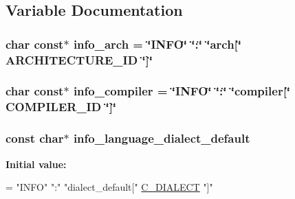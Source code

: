 \subsection{Variable Documentation}
\subsubsection[{\texorpdfstring{info\+\_\+arch}{info_arch}}]{\setlength{\rightskip}{0pt plus 5cm}char const$\ast$ info\+\_\+arch = \char`\"{}I\+N\+FO\char`\"{} \char`\"{}\+:\char`\"{} \char`\"{}arch\mbox{[}\char`\"{} A\+R\+C\+H\+I\+T\+E\+C\+T\+U\+R\+E\+\_\+\+ID \char`\"{}\mbox{]}\char`\"{}}\hypertarget{a00014_a59647e99d304ed33b15cb284c27ed391_a59647e99d304ed33b15cb284c27ed391}{}\label{a00014_a59647e99d304ed33b15cb284c27ed391_a59647e99d304ed33b15cb284c27ed391}
\subsubsection[{\texorpdfstring{info\+\_\+compiler}{info_compiler}}]{\setlength{\rightskip}{0pt plus 5cm}char const$\ast$ info\+\_\+compiler = \char`\"{}I\+N\+FO\char`\"{} \char`\"{}\+:\char`\"{} \char`\"{}compiler\mbox{[}\char`\"{} C\+O\+M\+P\+I\+L\+E\+R\+\_\+\+ID \char`\"{}\mbox{]}\char`\"{}}\hypertarget{a00014_a4b0efeb7a5d59313986b3a0390f050f6_a4b0efeb7a5d59313986b3a0390f050f6}{}\label{a00014_a4b0efeb7a5d59313986b3a0390f050f6_a4b0efeb7a5d59313986b3a0390f050f6}
\subsubsection[{\texorpdfstring{info\+\_\+language\+\_\+dialect\+\_\+default}{info_language_dialect_default}}]{\setlength{\rightskip}{0pt plus 5cm}const char$\ast$ info\+\_\+language\+\_\+dialect\+\_\+default}\hypertarget{a00014_a1ce162bad2fe6966ac8b33cc19e120b8_a1ce162bad2fe6966ac8b33cc19e120b8}{}\label{a00014_a1ce162bad2fe6966ac8b33cc19e120b8_a1ce162bad2fe6966ac8b33cc19e120b8}
{\bfseries Initial value\+:}
\begin{DoxyCode}
=
  \textcolor{stringliteral}{"INFO"} \textcolor{stringliteral}{":"} \textcolor{stringliteral}{"dialect\_default["} \hyperlink{a00014_a07f8e5783674099cd7f5110e22a78cdb_a07f8e5783674099cd7f5110e22a78cdb}{C\_DIALECT} \textcolor{stringliteral}{"]"}
\end{DoxyCode}
